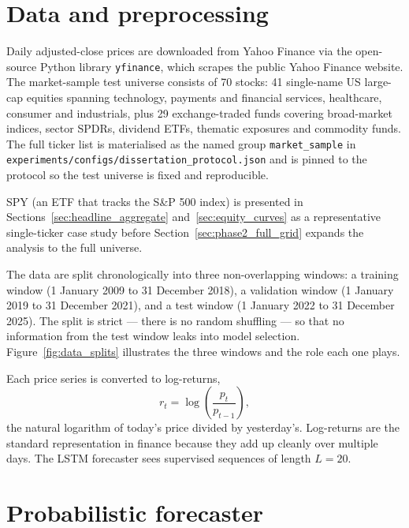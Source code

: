 \section{Data and preprocessing}
\label{sec:data_preprocessing}

Daily adjusted-close prices are downloaded from Yahoo Finance via the open-source Python library \texttt{yfinance}, which scrapes the public Yahoo Finance website. The market-sample test universe consists of 70 stocks: 41 single-name US large-cap equities spanning technology, payments and financial services, healthcare, consumer and industrials, plus 29 exchange-traded funds covering broad-market indices, sector SPDRs, dividend ETFs, thematic exposures and commodity funds. The full ticker list is materialised as the named group \texttt{market\_sample} in \texttt{experiments/configs/dissertation\_protocol.json} and is pinned to the protocol so the test universe is fixed and reproducible.

SPY (an ETF that tracks the S\&P 500 index) is presented in Sections~\ref{sec:headline_aggregate} and~\ref{sec:equity_curves} as a representative single-ticker case study before Section~\ref{sec:phase2_full_grid} expands the analysis to the full universe.

The data are split chronologically into three non-overlapping windows: a training window (1 January 2009 to 31 December 2018), a validation window (1 January 2019 to 31 December 2021), and a test window (1 January 2022 to 31 December 2025). The split is strict --- there is no random shuffling --- so that no information from the test window leaks into model selection. Figure~\ref{fig:data_splits} illustrates the three windows and the role each one plays.



Each price series is converted to log-returns,
\begin{equation}
  \label{eq:log_returns}
  r_t = \log\!\left( \frac{p_t}{p_{t-1}} \right),
\end{equation}
the natural logarithm of today's price divided by yesterday's. Log-returns are the standard representation in finance because they add up cleanly over multiple days. The LSTM forecaster sees supervised sequences of length $L = 20$.

\section{Probabilistic forecaster}
\label{sec:probabilistic_forecaster}

